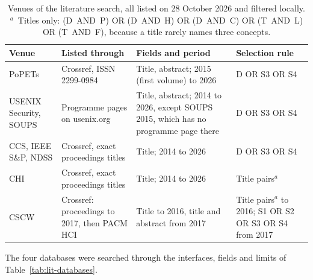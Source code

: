 \begin{table}[H]
\centering
\begin{singlespace}
\caption[Venues of the literature search]{Venues of the literature search, all
listed on 28 October 2026 and filtered locally. $^a$~Titles only:
\mbox{(D AND P)} OR \mbox{(D AND H)} OR \mbox{(D AND C)} OR \mbox{(T AND L)} OR
\mbox{(T AND F)}, because a title rarely names three concepts.}
\label{tab:lit-venues}
\small
\begin{tabularx}{\textwidth}{@{}>{\raggedright\arraybackslash}p{2.3cm}>{\raggedright\arraybackslash}p{3.0cm}>{\raggedright\arraybackslash}p{3.7cm}>{\raggedright\arraybackslash}X@{}}
\toprule
\textbf{Venue} & \textbf{Listed through} & \textbf{Fields and period} & \textbf{Selection rule} \\
\midrule
PoPETs & Crossref, ISSN 2299-0984 & Title, abstract; 2015 (first volume) to 2026 & D OR S3 OR S4 \\
USENIX Security, SOUPS & Programme pages on usenix.org & Title, abstract; 2014 to 2026, except SOUPS 2015, which has no programme page there & D OR S3 OR S4 \\
CCS, IEEE S\&P, NDSS & Crossref, exact proceedings titles & Title; 2014 to 2026 & D OR S3 OR S4 \\
CHI & Crossref, exact proceedings titles & Title; 2014 to 2026 & Title pairs$^a$ \\
CSCW & Crossref: proceedings to 2017, then PACM HCI & Title to 2016, title and abstract from 2017 & Title pairs$^a$ to 2016; S1 OR S2 OR S3 OR S4 from 2017 \\
\bottomrule
\end{tabularx}
\end{singlespace}
\end{table}

The four databases were searched through the interfaces, fields and limits of
Table~\ref{tab:lit-databases}.

